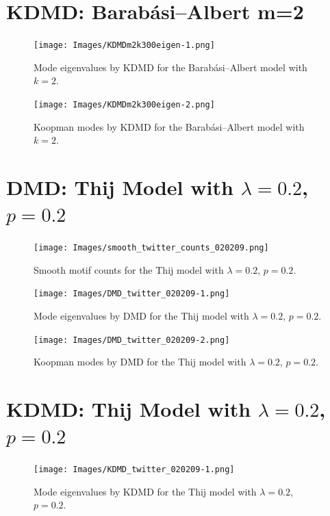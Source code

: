 \clearpage

\section{KDMD: Barabási–Albert m=2}

\begin{figure}
    \texttt{[image: Images/KDMDm2k300eigen-1.png]}
    \centering
    \caption{Mode eigenvalues by KDMD for the Barabási–Albert model
    with $k=2$.}
\end{figure}

\begin{figure}
    \texttt{[image: Images/KDMDm2k300eigen-2.png]}
    \centering
    \caption{Koopman modes by KDMD for the Barabási–Albert model
    with $k=2$.}
\end{figure}

\clearpage

\section{DMD: Thij Model with $\lambda=0.2$, $p=0.2$}
\begin{figure}
    \texttt{[image: Images/smooth\_twitter\_counts\_020209.png]}
    \centering
    \caption{Smooth motif counts for the Thij model
    with $\lambda=0.2$, $p=0.2$.}
    \label{fig:pthij0202}
\end{figure}

\clearpage

\begin{figure}
    \texttt{[image: Images/DMD\_twitter\_020209-1.png]}
    \centering
    \caption{Mode eigenvalues by DMD for the Thij model
    with $\lambda=0.2$, $p=0.2$.}
\end{figure}

\begin{figure}
    \texttt{[image: Images/DMD\_twitter\_020209-2.png]}
    \centering
    \caption{Koopman modes by DMD for the Thij model
    with $\lambda=0.2$, $p=0.2$.}
\end{figure}

\clearpage

\section{KDMD: Thij Model with $\lambda=0.2$, $p=0.2$}

\FloatBarrier


\begin{figure}
    \texttt{[image: Images/KDMD\_twitter\_020209-1.png]}
    \centering
    \caption{Mode eigenvalues by KDMD for the Thij model
    with $\lambda=0.2$, $p=0.2$.}
\end{figure}


